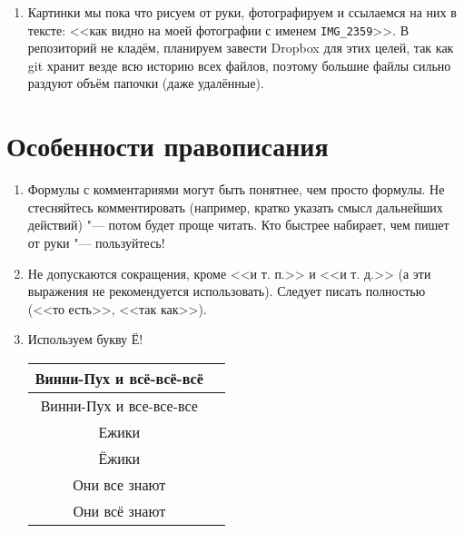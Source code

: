 \begin{enumerate}
\item
	Картинки мы пока что рисуем от руки, фотографируем и ссылаемся на них в тексте:
	<<как видно	на моей фотографии с именем \texttt{IMG\_2359}>>.
	В репозиторий не кладём, планируем завести Dropbox для этих целей, так как git
	хранит везде всю историю всех файлов, поэтому большие файлы сильно раздуют
	объём папочки (даже удалённые).

\end{enumerate}

\section{Особенности правописания}

\begin{enumerate}
\item
	Формулы с комментариями могут быть понятнее, чем просто формулы.
	Не стесняйтесь комментировать (например, кратко указать смысл
	дальнейших действий) "--- потом будет проще читать.
	Кто быстрее набирает, чем пишет от руки "--- пользуйтесь!

\item
	Не допускаются сокращения, кроме <<и т. п.>> и <<и т. д.>> (а эти выражения не рекомендуется использовать).
	Следует писать полностью (<<то есть>>, <<так как>>).
	
\item Используем букву Ё!
	\begin{center}\begin{tabular}{|c|c|}
		\hline Винни-Пух и всё-всё-всё \bad \\
		\hline Винни-Пух и все-все-все \ok \\
		\hline Ежики \bad \\
		\hline Ёжики \ok \\
		\hline Они все знают \ok \\
		\hline Они всё знают \ok \\
		\hline
	\end{tabular}\end{center}


\end{enumerate}
